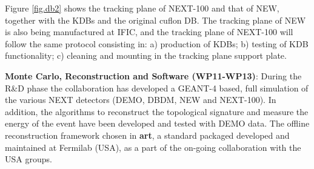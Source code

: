 Figure \ref{fig.db2} shows the tracking plane of NEXT-100 and that of NEW, together with the KDBs and the original cuflon DB. The tracking plane of NEW is also being manufactured at IFIC, and the tracking plane of NEXT-100 will follow the same protocol consisting in: a) production of KDBs; b) testing of KDB functionality; c) cleaning and mounting in the tracking plane support plate. 

{\bf Monte Carlo, Reconstruction and Software (WP11-WP13)}: During the R\&D phase the collaboration has developed a GEANT-4 based, full simulation of the various NEXT detectors (DEMO, DBDM, NEW and NEXT-100). In addition, the algorithms to reconstruct the topological signature and measure the energy of the event have been developed and tested with DEMO data. The offline reconstruction framework chosen in {\bf art}, a standard packaged developed and maintained at Fermilab (USA), as a part of the on-going collaboration with the USA groups. 